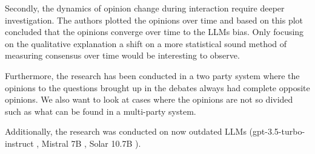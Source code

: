Secondly, the dynamics of opinion change during interaction require deeper investigation. The authors plotted the opinions over time and based on this plot concluded that the opinions converge over time to the LLMs bias. Only focusing on the qualitative explanation a shift on a more statistical sound method of measuring consensus over time would be interesting to observe. 

Furthermore, the research has been conducted in a two party system where the opinions to the questions brought up in the debates always had complete opposite opinions. We also want to look at cases where the opinions are not so divided such as what can be found in a multi-party system. 

Additionally, the research was conducted on now outdated LLMs (gpt-3.5-turbo-instruct \citet{brown2020language}, Mistral 7B \citet{jiang2023mistral7b}, Solar 10.7B \citet{kim2024Solar}). 







